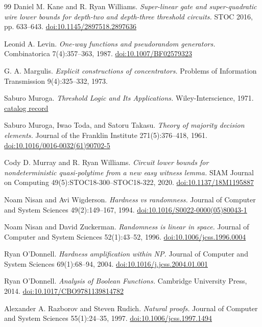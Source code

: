 \documentclass[11pt,letterpaper]{article}
\theoremstyle{definition}
\theoremstyle{remark}
\begin{document}
\begin{thebibliography}{99}
 Daniel M. Kane and R. Ryan Williams. \emph{Super-linear gate
and super-quadratic wire lower bounds for depth-two and depth-three
threshold circuits.} STOC 2016, pp. 633--643.
\href{https://doi.org/10.1145/2897518.2897636}{doi:10.1145/2897518.2897636}

 Leonid A. Levin. \emph{One-way functions and pseudorandom
generators.} Combinatorica 7(4):357--363, 1987.
\href{https://doi.org/10.1007/BF02579323}{doi:10.1007/BF02579323}

 G. A. Margulis. \emph{Explicit constructions of
concentrators.} Problems of Information Transmission 9(4):325--332, 1973.

 Saburo Muroga. \emph{Threshold Logic and Its Applications.}
Wiley-Interscience, 1971.
\href{https://books.google.com/books?id=F4VWAAAAMAAJ}{catalog record}

 Saburo Muroga, Iwao Toda, and Satoru Takasu. \emph{Theory of
majority decision elements.} Journal of the Franklin Institute
271(5):376--418, 1961.
\href{https://doi.org/10.1016/0016-0032(61)90702-5}{doi:10.1016/0016-0032(61)90702-5}

 Cody D. Murray and R. Ryan Williams. \emph{Circuit lower
bounds for nondeterministic quasi-polytime from a new easy witness
lemma.} SIAM Journal on Computing 49(5):STOC18-300--STOC18-322, 2020.
\href{https://doi.org/10.1137/18M1195887}{doi:10.1137/18M1195887}

 Noam Nisan and Avi Wigderson. \emph{Hardness vs randomness.}
Journal of Computer and System Sciences 49(2):149--167, 1994.
\href{https://doi.org/10.1016/S0022-0000(05)80043-1}{doi:10.1016/S0022-0000(05)80043-1}

 Noam Nisan and David Zuckerman. \emph{Randomness is linear in
space.} Journal of Computer and System Sciences 52(1):43--52, 1996.
\href{https://doi.org/10.1006/jcss.1996.0004}{doi:10.1006/jcss.1996.0004}

 Ryan O'Donnell. \emph{Hardness amplification
within NP.} Journal of Computer and System Sciences 69(1):68--94,
2004.
\href{https://doi.org/10.1016/j.jcss.2004.01.001}{doi:10.1016/j.jcss.2004.01.001}

 Ryan O'Donnell. \emph{Analysis of Boolean
Functions.} Cambridge University Press, 2014.
\href{https://doi.org/10.1017/CBO9781139814782}{doi:10.1017/CBO9781139814782}

 Alexander A. Razborov and Steven Rudich. \emph{Natural
proofs.} Journal of Computer and System Sciences 55(1):24--35, 1997.
\href{https://doi.org/10.1006/jcss.1997.1494}{doi:10.1006/jcss.1997.1494}


\end{thebibliography}
\end{document}
